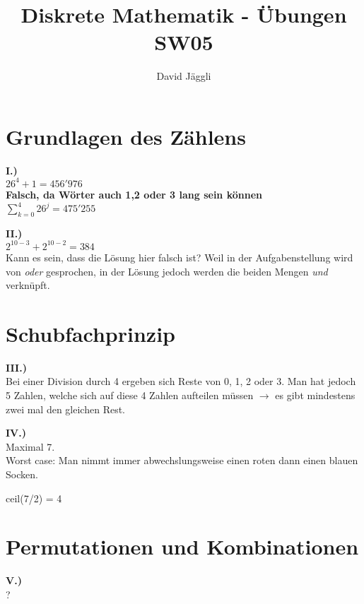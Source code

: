 \documentclass[12pt]{scrartcl}
\author{David Jäggli}
\title{Diskrete Mathematik - Übungen SW05}
\begin{document}
\maketitle

\tableofcontents

\newpage
\section{Grundlagen des Zählens}
\textbf{I.)}\\

$26^4 + 1 = 456'976$\\

\textbf{Falsch, da Wörter auch 1,2 oder 3 lang sein können}\\

$\displaystyle{\sum_{k=0}^{4} 26^j = 475'255}$\\
\vspace{20px}

\textbf{II.)}\\
$2^{10-3} + 2^{10-2} = 384$\\

Kann es sein, dass die Lösung hier falsch ist? Weil in der Aufgabenstellung wird von 
\textit{oder} gesprochen, in der Lösung jedoch werden die beiden Mengen \textit{und} verknüpft.\\


\section{Schubfachprinzip}
\textbf{III.)}\\
Bei einer Division durch 4 ergeben sich Reste von 0, 1, 2 oder 3. Man hat jedoch
5 Zahlen, welche sich auf diese 4 Zahlen aufteilen müssen $\rightarrow$ es gibt mindestens
zwei mal den gleichen Rest.


\textbf{IV.)}\\
Maximal 7. \\
Worst case: Man nimmt immer abwechslungsweise einen roten dann einen blauen Socken.

ceil(7/2) = 4\\


\section{Permutationen und Kombinationen}
\textbf{V.)}\\
?\\
\end{document}
